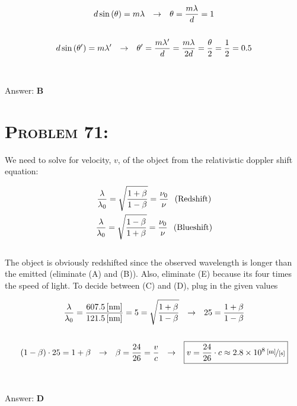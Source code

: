\documentclass{article}
\providecommand{\e}[1]{\ensuremath{\times 10^{#1}}}
\begin{document}
\begin{gather}
d \sin{(\theta)} = m \lambda \hspace{.1in} \rightarrow \hspace{.1in}   \theta = \frac{m \lambda}{d} = 1\nonumber\\
\nonumber\\
d \sin{(\theta')} = m \lambda' \hspace{.1in} \rightarrow \hspace{.1in}   \theta' = \frac{m \lambda'}{d} = \frac{m \lambda}{2d} = \frac{\theta}{2} =\frac{1}{2} = 0.5\nonumber
\end{gather}
\\\\
Answer: \textbf{\textcolor{ProcessBlue}B}\\


\section{\textsc{Problem 71:}} We need to solve for velocity, $v$, of the object from the relativistic doppler shift equation:

\begin{gather}
\frac{\lambda}{\lambda_{0}} = \sqrt{\frac{1+\beta}{1-\beta}} = \frac{\nu_{0}}{\nu} \hspace{.1in}  \text{(Redshift)}\\
\frac{\lambda}{\lambda_{0}} = \sqrt{\frac{1-\beta}{1+\beta}} = \frac{\nu_{0}}{\nu} \hspace{.1in} \text{(Blueshift)}
\end{gather}
\\
The object is obviously redshifted since the observed wavelength is longer than the emitted (eliminate (A) and (B)). Also, eliminate (E) because its four times the speed of light. To decide between (C) and (D), plug in the given values

\begin{gather}
\frac{\lambda}{\lambda_{0}} = \frac{\unit[607.5]{[nm]}}{\unit[121.5]{[nm]}} = 5 = \sqrt{\frac{1+\beta}{1-\beta}} \hspace{.1in} \rightarrow \hspace{.1in}
25 = \frac{1+\beta}{1-\beta}\nonumber \\
\nonumber \\
(1-\beta)\cdot 25 = 1+\beta \hspace{.1in} \rightarrow \hspace{.1in} \beta = \frac{24}{26} = \frac{v}{c} \hspace{.1in} \rightarrow \hspace{.1in} \boxed{v = \frac{24}{26}\cdot c \approx \unitfrac[2.8\e{8}]{[m]}{[s]}}\nonumber
\end{gather}
\\\\
Answer: \textbf{\textcolor{ProcessBlue}D}\\
\end{document}

